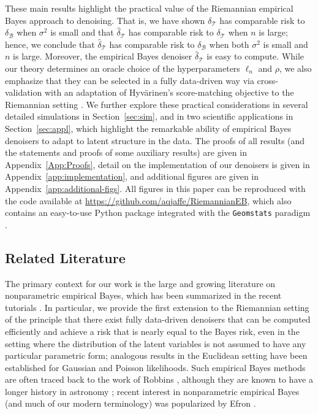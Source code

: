 \documentclass[preprint]{imsart}
\theoremstyle{plain}
\theoremstyle{definition}
\newcommand{\B}{\mathcal{B}}
\newcommand{\T}{\mathcal{T}}
\begin{document}
    These main results highlight the practical value of the Riemannian empirical Bayes approach to denoising.
    That is, we have shown $\delta_{\T}$ has comparable risk to $\delta_{\B}$ when $\sigma^2$ is small and that $\hat{\delta}_{\T}$ has comparable risk to $\delta_{\T}$ when $n$ is large; hence, we conclude that $\hat{\delta}_{\T}$ has comparable risk to $\delta_{\B}$ when both $\sigma^2$ is small and $n$ is large.
    Moreover, the empirical Bayes denoiser $\hat{\delta}_{\T}$ is easy to compute.
    While our theory determines an oracle choice of the hyperparameters $\ell_n$ and $\rho$, we also emphasize that they can be selected in a fully data-driven way via cross-validation with an adaptation of Hyv\"arinen’s score-matching objective \cite{hyvarinen2005,vincent2011connection} to the Riemannian setting 
    \cite{de2022riemannian}.
    We further explore these practical considerations in several detailed simulations in Section~\ref{sec:sim}, and in two scientific applications in Section~\ref{sec:appl}, which highlight the remarkable ability of empirical Bayes denoisers to adapt to latent structure in the data.
    The proofs of all results (and the statements and proofs of some auxiliary results) are given in Appendix~\ref{App:Proofs}, detail on the implementation of our denoisers is given in Appendix~\ref{app:implementation}, and additional figures are given in Appendix~\ref{app:additional-figs}.
    All figures in this paper can be reproduced with the code available at \url{https://github.com/aqjaffe/RiemannianEB}, which also contains an easy-to-use Python package integrated with the \texttt{Geomstats} paradigm \cite{GeomStats}.
    
\subsection{Related Literature}

The primary context for our work is the large and growing literature on nonparametric empirical Bayes, which has been summarized in the recent tutorials \cite{IgnatiadisSen,Koenker_Gu_2026}.
In particular, we provide the first extension to the Riemannian setting of the principle that there exist fully data-driven denoisers that can be computed efficiently and achieve a risk that is nearly equal to the Bayes risk, even in the setting where the distribution of the latent variables is not assumed to have any particular parametric form; analogous results in the Euclidean setting have been established for Gaussian \cite{Zhang1997, JiangZhang, SahaGuntuboyina, Soloff} and Poisson \cite{JanaPolyanskiyWu, ShenWu} likelihoods.
Such empirical Bayes methods are often traced back to the work of Robbins \cite{Robbins1956}, although they are known to have a longer history in astronomy \cite{dyson1926method,eddington1940correction}; recent interest in nonparametric empirical Bayes (and much of our modern terminology) was popularized by Efron \cite{efron2011tweedie,Efron2014, efron2019bayes}.
\end{document}

